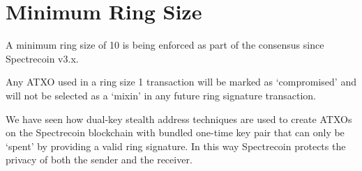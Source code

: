 \section{Minimum Ring Size}

A minimum ring size of 10 is being enforced as part of the consensus since Spectrecoin v3.x. 

 

Any ATXO used in a ring size 1 transaction will be marked as ‘compromised’ and will not be selected as a 
‘mixin’ in any future ring signature transaction. 

 

We have seen how dual-key stealth address techniques are used to create ATXOs on the Spectrecoin 
blockchain with bundled one-time key pair that can only be ‘spent’ by providing a valid ring signature. 
In this way Spectrecoin protects the privacy of both the sender and the receiver. 